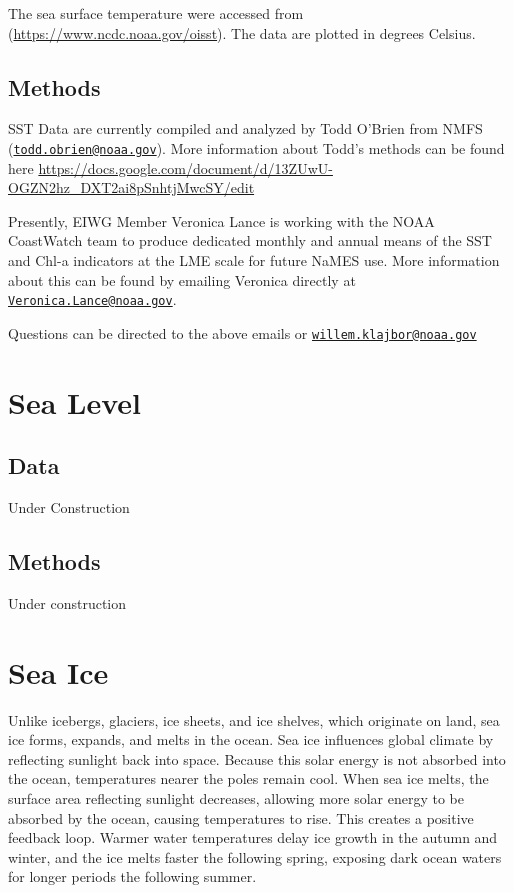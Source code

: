 \documentclass[
]{book}
\begin{document}
The sea surface temperature were accessed from (\url{https://www.ncdc.noaa.gov/oisst}). The data are plotted in degrees Celsius.

\hypertarget{methods-8}{%
\section{Methods}\label{methods-8}}

SST Data are currently compiled and analyzed by Todd O'Brien from NMFS (\href{mailto:todd.obrien@noaa.gov}{\nolinkurl{todd.obrien@noaa.gov}}). More information about Todd's methods can be found here \url{https://docs.google.com/document/d/13ZUwU-OGZN2hz_DXT2ai8pSnhtjMwcSY/edit}

Presently, EIWG Member Veronica Lance is working with the NOAA CoastWatch team to produce dedicated monthly and annual means of the SST and Chl-a indicators at the LME scale for future NaMES use. More information about this can be found by emailing Veronica directly at \href{mailto:Veronica.Lance@noaa.gov}{\nolinkurl{Veronica.Lance@noaa.gov}}.

Questions can be directed to the above emails or \href{mailto:willem.klajbor@noaa.gov}{\nolinkurl{willem.klajbor@noaa.gov}}

\hypertarget{sea-level}{%
\chapter{Sea Level}\label{sea-level}}

\hypertarget{data-9}{%
\section{Data}\label{data-9}}

Under Construction

\hypertarget{methods-9}{%
\section{Methods}\label{methods-9}}

Under construction

\hypertarget{sea-ice}{%
\chapter{Sea Ice}\label{sea-ice}}

Unlike icebergs, glaciers, ice sheets, and ice shelves, which originate on land, sea ice forms, expands, and melts in the ocean. Sea ice influences global climate by reflecting sunlight back into space. Because this solar energy is not absorbed into the ocean, temperatures nearer the poles remain cool. When sea ice melts, the surface area reflecting sunlight decreases, allowing more solar energy to be absorbed by the ocean, causing temperatures to rise. This creates a positive feedback loop. Warmer water temperatures delay ice growth in the autumn and winter, and the ice melts faster the following spring, exposing dark ocean waters for longer periods the following summer.
\end{document}

